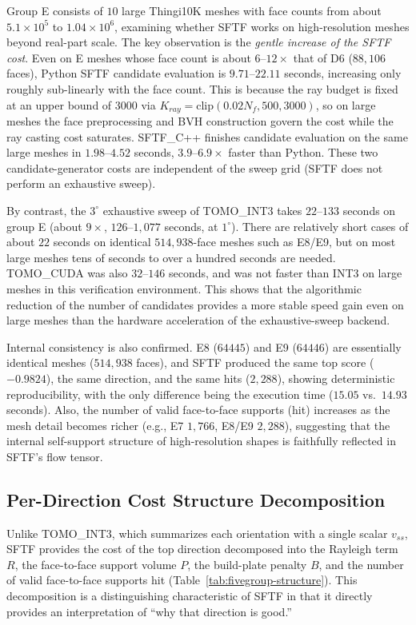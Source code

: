 \documentclass[11pt,a4paper]{article}
\begin{document}
Group E consists of $10$ large Thingi10K meshes with face counts from about $5.1\times10^5$ to $1.04\times10^6$,
examining whether SFTF works on high-resolution meshes beyond real-part scale.
The key observation is the \emph{gentle increase of the SFTF cost}.
Even on E meshes whose face count is about $6$--$12\times$ that of D6 ($88{,}106$ faces), Python SFTF candidate evaluation is $9.71$--$22.11$ seconds,
increasing only roughly sub-linearly with the face count.
This is because the ray budget is fixed at an upper bound of $3000$ via $K_{ray}=\mathrm{clip}(0.02N_f,500,3000)$,
so on large meshes the face preprocessing and BVH construction govern the cost while the ray casting cost saturates.
SFTF\_C++ finishes candidate evaluation on the same large meshes in $1.98$--$4.52$ seconds,
$3.9$--$6.9\times$ faster than Python.
These two candidate-generator costs are independent of the sweep grid (SFTF does not perform an exhaustive sweep).

By contrast, the $3^\circ$ exhaustive sweep of TOMO\_INT3 takes $22$--$133$ seconds on group E (about $9\times$, $126$--$1{,}077$ seconds, at $1^\circ$).
There are relatively short cases of about $22$ seconds on identical $514{,}938$-face meshes such as E8/E9, but
on most large meshes tens of seconds to over a hundred seconds are needed.
TOMO\_CUDA was also $32$--$146$ seconds, and was not faster than INT3 on large meshes in this verification environment.
This shows that the algorithmic reduction of the number of candidates provides a more stable speed gain even on large meshes
than the hardware acceleration of the exhaustive-sweep backend.

Internal consistency is also confirmed.
E8 ($64445$) and E9 ($64446$) are essentially identical meshes ($514{,}938$ faces),
and SFTF produced the same top score ($-0.9824$), the same direction, and the same hits ($2{,}288$),
showing deterministic reproducibility, with the only difference being the execution time ($15.05$ vs.\ $14.93$ seconds).
Also, the number of valid face-to-face supports (hit) increases as the mesh detail becomes richer
(e.g., E7 $1{,}766$, E8/E9 $2{,}288$), suggesting that the internal self-support structure of high-resolution shapes
is faithfully reflected in SFTF's flow tensor.

\subsection{Per-Direction Cost Structure Decomposition}

Unlike TOMO\_INT3, which summarizes each orientation with a single scalar $v_{ss}$,
SFTF provides the cost of the top direction decomposed into the Rayleigh term $R$, the face-to-face support volume $P$,
the build-plate penalty $B$, and the number of valid face-to-face supports hit
(Table~\ref{tab:fivegroup-structure}).
This decomposition is a distinguishing characteristic of SFTF in that it directly provides an interpretation of ``why that direction is good.''
\end{document}
